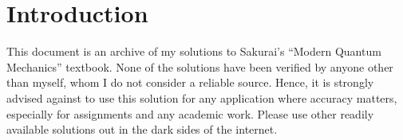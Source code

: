 \section{Introduction}

This document is an archive of my solutions to Sakurai's ``Modern Quantum Mechanics'' textbook.
None of the solutions have been verified by anyone other than myself, whom I do not consider a reliable source.
Hence, it is strongly advised against to use this solution for any application where accuracy matters,
especially for assignments and any academic work.
Please use other readily available solutions out in the dark sides of the internet.
